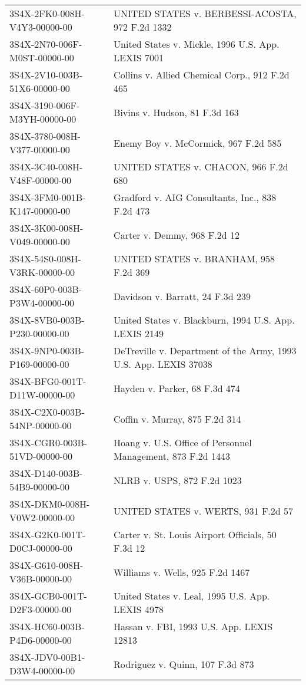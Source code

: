 \documentclass[10pt, letterpaper]{article}
\begin{document}
\begin{spacing}{1.0}
\begin{longtable}{p{2.5in}p{4in}}
    3S4X-2FK0-008H-V4Y3-00000-00 & UNITED STATES v. BERBESSI-ACOSTA, 972 F.2d 1332\\
    3S4X-2N70-006F-M0ST-00000-00 & United States v. Mickle, 1996 U.S. App. LEXIS 7001\\
    3S4X-2V10-003B-51X6-00000-00 & Collins v. Allied Chemical Corp., 912 F.2d 465\\
    3S4X-3190-006F-M3YH-00000-00 & Bivins v. Hudson, 81 F.3d 163\\
    3S4X-3780-008H-V377-00000-00 & Enemy Boy v. McCormick, 967 F.2d 585\\
    3S4X-3C40-008H-V48F-00000-00 & UNITED STATES v. CHACON, 966 F.2d 680\\
    3S4X-3FM0-001B-K147-00000-00 & Gradford v. AIG Consultants, Inc., 838 F.2d 473\\
    3S4X-3K00-008H-V049-00000-00 & Carter v. Demmy, 968 F.2d 12\\
    3S4X-54S0-008H-V3RK-00000-00 & UNITED STATES v. BRANHAM, 958 F.2d 369\\
    3S4X-60P0-003B-P3W4-00000-00 & Davidson v. Barratt, 24 F.3d 239\\
    3S4X-8VB0-003B-P230-00000-00 & United States v. Blackburn, 1994 U.S. App. LEXIS 2149\\
    3S4X-9NP0-003B-P169-00000-00 & DeTreville v. Department of the Army, 1993 U.S. App. LEXIS 37038\\
    3S4X-BFG0-001T-D11W-00000-00 & Hayden v. Parker, 68 F.3d 474\\
    3S4X-C2X0-003B-54NP-00000-00 & Coffin v. Murray, 875 F.2d 314\\
    3S4X-CGR0-003B-51VD-00000-00 & Hoang v. U.S. Office of Personnel Management, 873 F.2d 1443\\
    3S4X-D140-003B-54B9-00000-00 & NLRB v. USPS, 872 F.2d 1023\\
    3S4X-DKM0-008H-V0W2-00000-00 & UNITED STATES v. WERTS, 931 F.2d 57\\
    3S4X-G2K0-001T-D0CJ-00000-00 & Carter v. St. Louis Airport Officials, 50 F.3d 12\\
    3S4X-G610-008H-V36B-00000-00 & Williams v. Wells, 925 F.2d 1467\\
    3S4X-GCB0-001T-D2F3-00000-00 & United States v. Leal, 1995 U.S. App. LEXIS 4978\\
    3S4X-HC60-003B-P4D6-00000-00 & Hassan v. FBI, 1993 U.S. App. LEXIS 12813\\
    3S4X-JDV0-00B1-D3W4-00000-00 & Rodriguez v. Quinn, 107 F.3d 873\\

\end{longtable}
\end{spacing}
\end{document}
